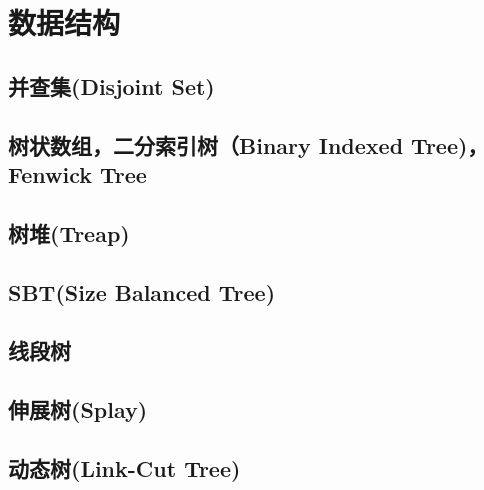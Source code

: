 
\chapter{数据结构}

\section{并查集(Disjoint Set)}

\section{树状数组，二分索引树（Binary Indexed Tree)，Fenwick Tree}

\section{树堆(Treap)}

\section{SBT(Size Balanced Tree)}

\section{线段树}

\section{伸展树(Splay)}

\section{动态树(Link-Cut Tree)}
